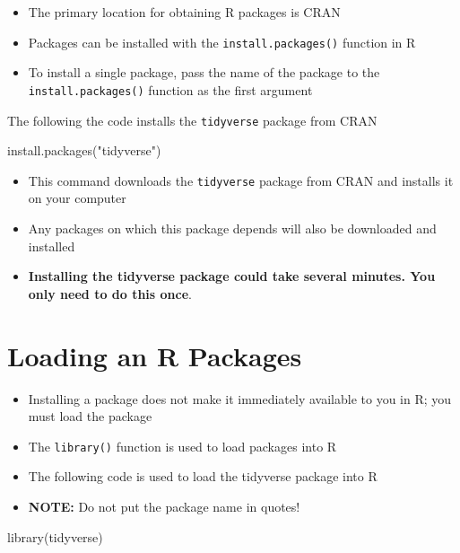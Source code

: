 \documentclass[
]{book}
\newenvironment{Shaded}{\begin{snugshade}}{\end{snugshade}}
\newcommand{\FunctionTok}[1]{\textcolor[rgb]{0.00,0.00,0.00}{#1}}
\newcommand{\NormalTok}[1]{#1}
\newcommand{\StringTok}[1]{\textcolor[rgb]{0.31,0.60,0.02}{#1}}
\begin{document}
\begin{itemize}
\item
  The primary location for obtaining R packages is CRAN
\item
  Packages can be installed with the \texttt{install.packages()} function in R
\item
  To install a single package, pass the name of the package to the \texttt{install.packages()} function as the first argument
\end{itemize}

The following the code installs the \texttt{tidyverse} package from CRAN

\begin{Shaded}
\begin{Highlighting}[]
\FunctionTok{install.packages}\NormalTok{(}\StringTok{"tidyverse"}\NormalTok{)}
\end{Highlighting}
\end{Shaded}

\begin{itemize}
\item
  This command downloads the \texttt{tidyverse} package from CRAN and installs it on your computer
\item
  Any packages on which this package depends will also be downloaded and installed
\item
  \textbf{Installing the tidyverse package could take several minutes. You only need to do this once}.
\end{itemize}

\hypertarget{loading-an-r-packages}{%
\section{Loading an R Packages}\label{loading-an-r-packages}}

\begin{itemize}
\item
  Installing a package does not make it immediately available to you in R; you must load the package
\item
  The \texttt{library()} function is used to load packages into R
\item
  The following code is used to load the tidyverse package into R
\item
  \textbf{NOTE:} Do not put the package name in quotes!
\end{itemize}

\begin{Shaded}
\begin{Highlighting}[]
\FunctionTok{library}\NormalTok{(tidyverse)}
\end{Highlighting}
\end{Shaded}
\end{document}
